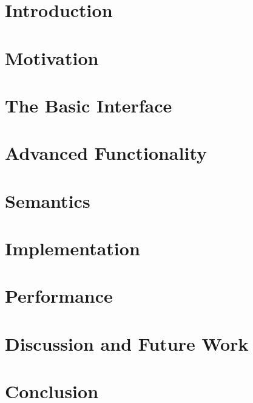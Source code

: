 \documentclass[preprint,nocopyrightspace]{sigplanconf}
\newcommand{\codesec}[1]{{\fontsize{10}{12}\selectfont \tt \bfseries #1}}
\newcommand{\typesec}[1]{{\codesec{\itshape #1}}}
\newcommand{\typeparamsec}[1]{{\codesec{\bfseries #1}}}
\newcommand{\xtypesec}[2]{{\typesec{#1}\typeparamsec{[#2]}}}
\begin{document}
\terms
\xterms

\keywords
\xkeywords

\section{Introduction}
\label{sec:intro}




\section{Motivation}
\label{sec:library}


\section{The Basic Interface}
\label{sec:ref}


\section{Advanced Functionality}
\label{sec:advanced}


\section{Semantics}
\label{sec:semantics}


\section{Implementation}
\label{sec:impl}


\section{Performance}
\label{sec:perf}


\section{Discussion and Future Work}
\label{sec:discussion}


\section{Conclusion}
\label{sec:conclusion}

\end{document}
